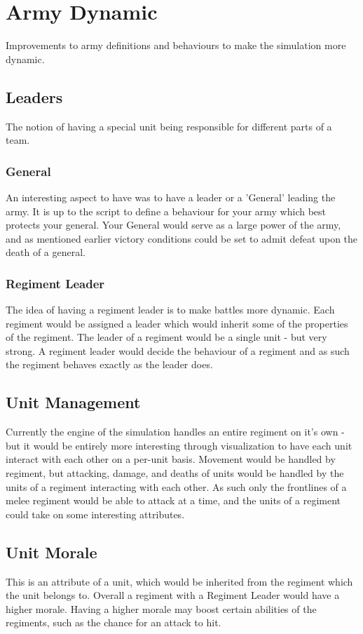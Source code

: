 \section{Army Dynamic}
Improvements to army definitions and behaviours to make the simulation more dynamic.
\subsection{Leaders}
The notion of having a special unit being responsible for different parts of a team.
\subsubsection*{General}
An interesting aspect to have was to have a leader or a 'General' leading the army. It is up to the script to define a behaviour for your army which best protects your general. Your General would serve as a large power of the army, and as mentioned earlier victory conditions could be set to admit defeat upon the death of a general.
\subsubsection*{Regiment Leader}
The idea of having a regiment leader is to make battles more dynamic. Each regiment would be assigned a leader which would inherit some of the properties of the regiment.
The leader of a regiment would be a single unit - but very strong. A regiment leader would decide the behaviour of a regiment and as such the regiment behaves exactly as the leader does.
\subsection{Unit Management}
Currently the engine of the simulation handles an entire regiment on it's own - but it would be entirely more interesting through visualization to have each unit interact with each other on a per-unit basis. Movement would be handled by regiment, but attacking, damage, and deaths of units would be handled by the units of a regiment interacting with each other. As such only the frontlines of a melee regiment would be able to attack at a time, and the units of a regiment could take on some interesting attributes.
\subsection{Unit Morale}
This is an attribute of a unit, which would be inherited from the regiment which the unit belongs to. Overall a regiment with a Regiment Leader would have a higher morale. Having a higher morale may boost certain abilities of the regiments, such as the chance for an attack to hit.
